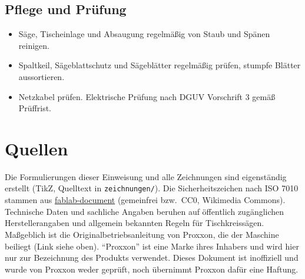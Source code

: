 \documentclass{\basedir/fablab-document}
\begin{document}
	\subsection{Pflege und Prüfung}
	\begin{itemize}
		\item Säge, Tischeinlage und Absaugung regelmäßig von Staub und Spänen reinigen.
		\item Spaltkeil, Sägeblattschutz und Sägeblätter regelmäßig prüfen, stumpfe Blätter aussortieren.
		\item Netzkabel prüfen. Elektrische Prüfung nach DGUV Vorschrift 3 gemäß Prüffrist.
	\end{itemize}

	\section{Quellen}
	Die Formulierungen dieser Einweisung und alle Zeichnungen sind eigenständig erstellt (TikZ, Quelltext in \texttt{zeichnungen/}). Die Sicherheitszeichen nach ISO 7010 stammen aus \href{https://github.com/fau-fablab/fablab-document}{fablab-document} (gemeinfrei bzw.\ CC0, Wikimedia Commons). Technische Daten und sachliche Angaben beruhen auf öffentlich zugänglichen Herstellerangaben und allgemein bekannten Regeln für Tischkreissägen. Maßgeblich ist die Originalbetriebsanleitung von Proxxon, die der Maschine beiliegt (Link siehe oben). \enquote{Proxxon} ist eine Marke ihres Inhabers und wird hier nur zur Bezeichnung des Produkts verwendet. Dieses Dokument ist inoffiziell und wurde von Proxxon weder geprüft, noch übernimmt Proxxon dafür eine Haftung.

\end{document}
